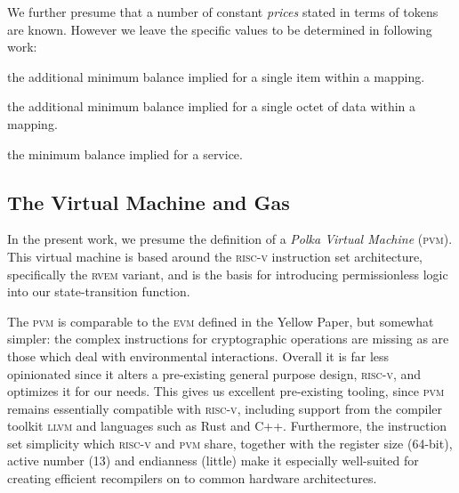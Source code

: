 We further presume that a number of constant \emph{prices} stated in terms of tokens are known. However we leave the specific values to be determined in following work:

\begin{description}\label{eq:prices}
  \item[$\mathsf{B}_I$] the additional minimum balance implied for a single item within a mapping.
  \item[$\mathsf{B}_L$] the additional minimum balance implied for a single octet of data within a mapping.
  \item[$\mathsf{B}_S$] the minimum balance implied for a service.
\end{description}




















\subsection{The Virtual Machine and Gas}\label{sec:virtualmachineandgas}

In the present work, we presume the definition of a \emph{Polka Virtual Machine} (\textsc{pvm}). This virtual machine is based around the \textsc{risc-v} instruction set architecture, specifically the \textsc{rv}\textsc{em} variant, and is the basis for introducing permissionless logic into our state-transition function.

The \textsc{pvm} is comparable to the \textsc{evm} defined in the Yellow Paper, but somewhat simpler: the complex instructions for cryptographic operations are missing as are those which deal with environmental interactions. Overall it is far less opinionated since it alters a pre-existing general purpose design, \textsc{risc-v}, and optimizes it for our needs. This gives us excellent pre-existing tooling, since \textsc{pvm} remains essentially compatible with \textsc{risc-v}, including support from the compiler toolkit \textsc{llvm} and languages such as Rust and C++. Furthermore, the instruction set simplicity which \textsc{risc-v} and \textsc{pvm} share, together with the register size (64-bit), active number (13) and endianness (little) make it especially well-suited for creating efficient recompilers on to common hardware architectures.

